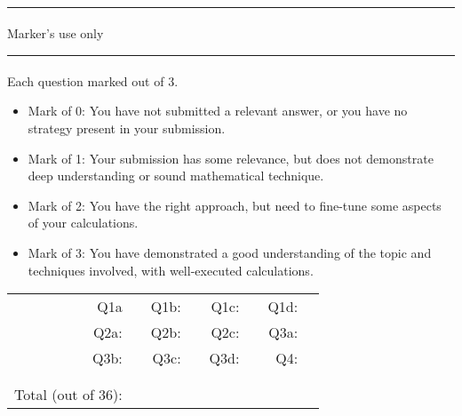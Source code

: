 \documentclass[a4paper, 11pt]{report}
\begin{document}
\hrule ${}^{}$\\
Marker's use only
\\
\hrule ${}^{}$\\
Each question marked out of 3.
\begin{itemize}
\item Mark of 0: You have not submitted a relevant answer, or you have no strategy present in your submission.\\
\item Mark of 1: Your submission has some relevance, but does not demonstrate deep understanding or sound mathematical technique. \\ %
\item Mark of 2: You have the right approach, but need to fine-tune some aspects of your calculations.\\
\item Mark of 3: You have demonstrated a good understanding of the topic and techniques involved, with well-executed calculations. \\ %
\end{itemize}
\begin{tabular}{rrrrrrrr}
Q1a & \hspace{2cm} & Q1b: & \hspace{2cm} & Q1c: & \hspace{2cm} & Q1d:  & \\[.5cm]
Q2a:& \hspace{2cm} & Q2b: & \hspace{2cm} & Q2c: & \hspace{2cm} & Q3a:  & \\[.5cm]
Q3b:& \hspace{2cm} & Q3c: & \hspace{2cm} & Q3d: & \hspace{2cm} & Q4:  & \\[.5cm]
& \hspace{2cm} &  & \hspace{2cm} & & \hspace{2cm} &  & \\[.5cm]
&&&&&&& \\
Total (out of 36): &&&&&&& \\
\end{tabular}

\vfill
\newpage
\end{document}
